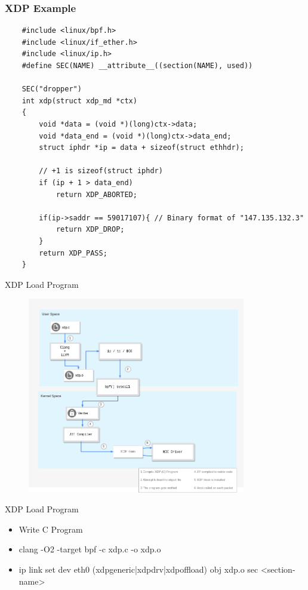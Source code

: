\documentclass{beamer}
\begin{document}
\begin{frame}[fragile]
  \frametitle{XDP Example}
  \begin{verbatim}
    #include <linux/bpf.h>
    #include <linux/if_ether.h>
    #include <linux/ip.h>
    #define SEC(NAME) __attribute__((section(NAME), used))

    SEC("dropper")
    int xdp(struct xdp_md *ctx)
    {
        void *data = (void *)(long)ctx->data;
        void *data_end = (void *)(long)ctx->data_end;
        struct iphdr *ip = data + sizeof(struct ethhdr);

        // +1 is sizeof(struct iphdr)
        if (ip + 1 > data_end)
            return XDP_ABORTED;

        if(ip->saddr == 59017107){ // Binary format of "147.135.132.3"
            return XDP_DROP;
        }
        return XDP_PASS;
    }
  \end{verbatim}
\end{frame}

\begin{frame}{XDP Load Program}
  \begin{figure}
    \includegraphics[width=0.85\textwidth]{./xdp_workflow.png}

  \end{figure}
\end{frame}

\begin{frame}{XDP Load Program}
  \begin{itemize}
    \item Write C Program
    \item clang -O2 -target bpf -c xdp.c -o xdp.o
    \item ip link set dev eth0 (xdpgeneric|xdpdrv|xdpoffload) obj xdp.o sec <section-name>
  \end{itemize}
\end{frame}
\end{document}
